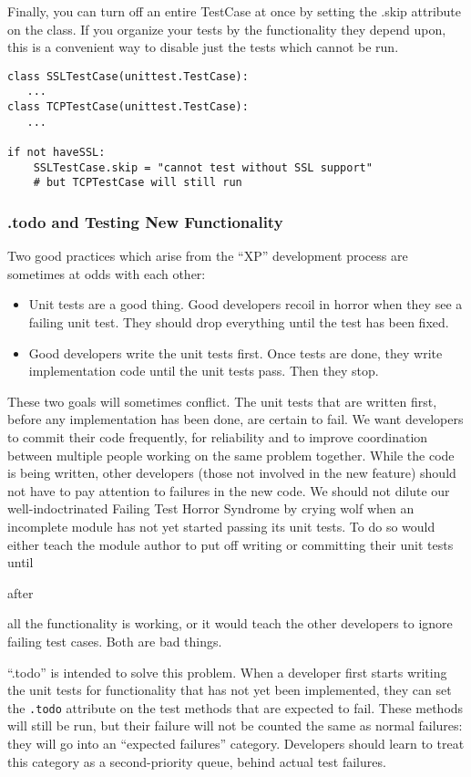 Finally, you can turn off an entire TestCase at once by setting the .skip attribute on the class. If you organize your tests by the functionality they depend upon, this is a convenient way to disable just the tests which cannot be run.\begin{verbatim}
class SSLTestCase(unittest.TestCase):
   ...
class TCPTestCase(unittest.TestCase):
   ...

if not haveSSL:
    SSLTestCase.skip = "cannot test without SSL support"
    # but TCPTestCase will still run
\end{verbatim}


\subsubsection{.todo and Testing New Functionality }


Two good practices which arise from the ``XP'' development process are sometimes at odds with each other:\begin{itemize}
\item Unit tests are a good thing. Good developers recoil in horror when   they see a failing unit test. They should drop everything until the test   has been fixed.
\item Good developers write the unit tests first. Once tests are done, they   write implementation code until the unit tests pass. Then they stop.
\end{itemize}


These two goals will sometimes conflict. The unit tests that are written first, before any implementation has been done, are certain to fail. We want developers to commit their code frequently, for reliability and to improve coordination between multiple people working on the same problem together. While the code is being written, other developers (those not involved in the new feature) should not have to pay attention to failures in the new code. We should not dilute our well-indoctrinated Failing Test Horror Syndrome by crying wolf when an incomplete module has not yet started passing its unit tests. To do so would either teach the module author to put off writing or committing their unit tests until \begin{em}after\end{em} all the functionality is working, or it would teach the other developers to ignore failing test cases. Both are bad things.

``.todo'' is intended to solve this problem. When a developer first starts writing the unit tests for functionality that has not yet been implemented, they can set the \texttt{.todo} attribute on the test methods that are expected to fail. These methods will still be run, but their failure will not be counted the same as normal failures: they will go into an ``expected failures'' category. Developers should learn to treat this category as a second-priority queue, behind actual test failures.

